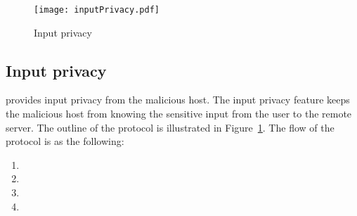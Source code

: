 \begin{figure}
\centering
\texttt{[image: inputPrivacy.pdf]}
\caption{Input privacy}
\label{fig:inputPrivacy}
\centering
\end{figure}

\subsection{Input privacy}
\label{sec:systemnDesign:inputPrivacy}

\name provides input privacy from the malicious host. The input privacy feature keeps the malicious host from knowing the sensitive input from the user to the remote server. The outline of the protocol is illustrated in Figure~\ref{fig:inputPrivacy}. The flow of the protocol is as the following:

\begin{enumerate}
  \item[\one]
  \item[\two]
  \item[\three]
  \item[\four]
\end{enumerate}



